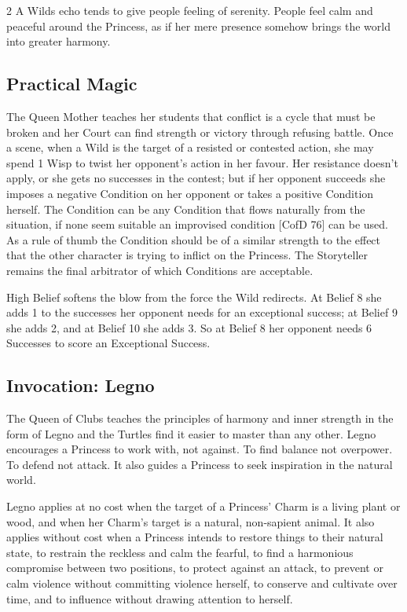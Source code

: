 \begin{multicols}{2}
A Wilds echo tends to give people feeling of serenity. People feel calm and peaceful around the Princess, as if her mere presence somehow brings the world into greater harmony.

\subsection*{Practical Magic}

The Queen Mother teaches her students that conflict is a cycle that must be broken and her Court can find strength or victory through refusing battle. Once a scene, when a Wild is the target of a resisted or contested action, she may spend 1 Wisp to twist her opponent’s action in her favour. Her resistance doesn’t apply, or she gets no successes in the contest; but if her opponent succeeds she imposes a negative Condition on her opponent or takes a positive Condition herself. The Condition can be any Condition that flows naturally from the situation, if none seem suitable an improvised condition [CofD 76] can be used. As a rule of thumb the Condition should be of a similar strength to the effect that the other character is trying to inflict on the Princess. The Storyteller remains the final arbitrator of which Conditions are acceptable.

High Belief softens the blow from the force the Wild redirects. At Belief 8 she adds 1 to the successes her opponent needs for an exceptional success; at Belief 9 she adds 2, and at Belief 10 she adds 3. So at Belief 8 her opponent needs 6 Successes to score an Exceptional Success. 

\subsection*{Invocation: Legno}

The Queen of Clubs teaches the principles of harmony and inner strength in the form of Legno and the Turtles find it easier to master than any other. Legno encourages a Princess to work with, not against. To find balance not overpower. To defend not attack. It also guides a Princess to seek inspiration in the natural world.

Legno applies at no cost when the target of a Princess' Charm is a living plant or wood, and when her Charm's target is a natural, non-sapient animal. It also applies without cost when a Princess intends to restore things to their natural state, to restrain the reckless and calm the fearful, to find a harmonious compromise between two positions, to protect against an attack, to prevent or calm violence without committing violence herself, to conserve and cultivate over time, and to influence without drawing attention to herself.


\end{multicols}

